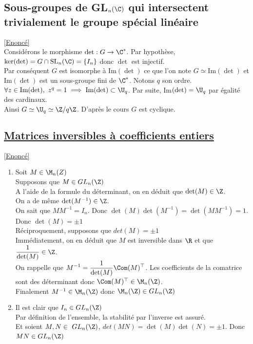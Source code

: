 \documentclass[8pt]{book}
\begin{document}
	\subsection{Sous-groupes de GL$_n(\C)$ qui intersectent trivialement le groupe spécial linéaire }
	\label{Sous-groupes de GLn(C) qui intersectent trivialement le groupe spécial linéaire corrigé}
	\textcolor{blue}{\hyperref[Sous-groupes de GLn(C) qui intersectent trivialement le groupe spécial linéaire]{[Enoncé]}}\\
	Considérons le morphisme $\det:G\to \C^*$. Par hypothèse, $\ker(\det)=G\cap\text{SL}_n(\C)=\{I_n\}$ donc $\det$ est injectif.\\
	Par conséquent $G$ est isomorphe à Im$(\det)$ ce que l'on note $G\simeq\text{Im}(\det)$ et Im$(\det)$ est un sous-groupe fini de $\C^*$. Notons $q$ son ordre. $\forall z\in \text{Im}(\det),\ z^q=1\implies \text{Im}(\det)\subset \U_q$. Par suite, Im$(\det)=\U_q$ par égalité des cardinaux.\\
	Ainsi $G\simeq \U_q\simeq \Z/q\Z$. D'après le cours $G$ est cyclique.
	
	\subsection{\underline{Matrices inversibles à coefficients entiers} }
	\label{Matrices inversibles à coefficients entiers corrigé}
	\textcolor{blue}{\hyperref[Matrices inversibles à coefficients entiers]{[Enoncé]}}\\
	\begin{enumerate}
		\item Soit $M\in\M_{n}(Z)$\\
		Supposons que $M\in GL_n(\Z)$\\
		A l'aide de la formule du déterminant, on en déduit que $\det(M)\in\Z$.\\
		On a de même $\det(M^{-1})\in\Z$.\\
		On sait que $MM^{-1}=I_n$. Donc $\det(M)\det(M^{-1})=\det(MM^{-1})=1$. Donc $\det(M)=\pm1$\\
		Réciproquement, supposons que $det(M)=\pm1$\\
		Immédiatement, on en déduit que $M$ est inversible dans $\R$ et que $\displaystyle\frac{1}{\det(M)}\in\Z$.\\
		On rappelle que $\displaystyle M^{-1}=\frac{1}{\det(M)}\Com(M)^\top$. Les coefficients de la comatrice sont des déterminant donc $\Com(M)^\top\in\M_{n}(\Z)$.\\
		Finalement $M^{-1}\in\M_{n}(\Z)$ donc $\M_{n}(\Z)\in GL_n(\Z)$
		\item Il est clair que $I_n\in GL_n(\Z)$\\
		Par définition de l'ensemble, la stabilité par l'inverse est assuré.\\
		Et soient $M,N\in\ GL_n(\Z)$, $det(MN)=\det(M)\det(N)=\pm1$. Donc $MN\in GL_n(\Z)$
		
	\end{enumerate}
	
\end{document}
